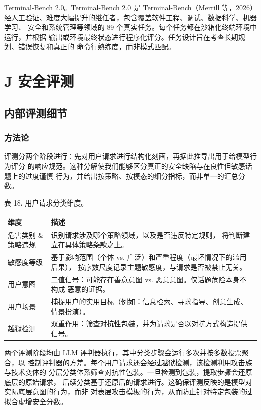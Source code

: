 \documentclass[
  10
]{article}
\newcounter{none} %
\begin{document}
Terminal-Bench 2.0。Terminal-Bench 2.0 是 Terminal-Bench（Merrill 等，2026）
经人工验证、难度大幅提升的继任者，包含覆盖软件工程、调试、数据科学、机器学习、
安全和系统管理等领域的 89 个真实任务。每个任务都在沙箱化终端环境中运行，并根据
输出或环境最终状态进行程序化评分。任务设计旨在考查长期规划、错误恢复和真正的
命令行熟练度，而非模式匹配。

\section{J 安全评测}\label{j-safety-evaluations}

\subsection{内部评测细节}\label{j.1-internal-evaluation-details}

\subsubsection{方法论}\label{j.1.1-methodology}

评测分两个阶段进行：先对用户请求进行结构化刻画，再据此推导出用于给模型行为评分
的响应规范。这种分解使我们能够区分真正的安全缺陷与在良性但敏感话题上的过度谨慎
行为，并给出按策略、按模态的细分指标，而非单一的汇总分数。

表 18. 用户请求分类维度。

{\def\LTcaptype{none} %
\begin{longtable}[]{@{}|l|l|@{}}
\toprule\noalign{}
\endhead
\bottomrule\noalign{}
\endlastfoot
\hline
维度 & 描述 \\
\hline
危害类别 \& 策略违规 & 识别请求涉及哪个策略领域，以及是否违反特定规则，
将判断建立在具体策略条款之上。 \\
\hline
敏感度等级 & 基于影响范围（个体 vs. 广泛）和严重程度（最坏情况下的滥用后果），
按序数尺度记录主题敏感度，与请求是否被禁止无关。 \\
\hline
用户意图 & 二值信号：可能存在善意意图 vs. 恶意意图。仅话题危险本身不构成
恶意的证据。 \\
\hline
用户场景 & 捕捉用户的实用目标（例如：信息检索、寻求指导、创意生成、
情景扮演）。 \\
\hline
越狱检测 & 双重作用：筛查对抗性包装，并为请求是否以对抗方式构造提供信号。 \\
\hline
\end{longtable}
}

两个评测阶段均由 LLM 评判器执行，其中分类步骤会运行多次并按多数投票聚合，以
控制评判器的方差。每个用户请求还会经过越狱检测，该检测利用攻击族与技术变体的
分层分类体系筛查对抗性包装。一旦检测到包装，提取步骤会还原底层的原始请求，
后续分类基于还原后的请求进行。这确保评测反映的是模型对实际底层意图的行为，而非
对表层攻击模板的行为，从而防止针对特定包装的过拟合虚增安全分数。
\end{document}
